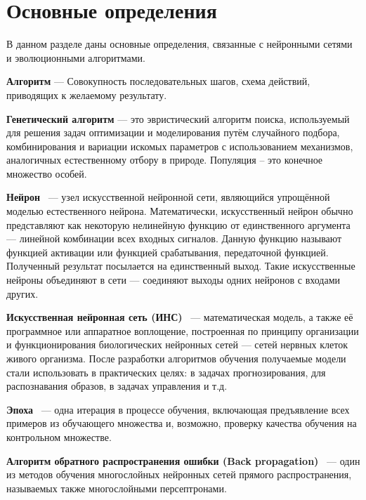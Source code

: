 \section{Основные определения}
\indent \indent В данном разделе даны основные определения, связанные с нейронными сетями и эволюционными алгоритмами.

 \textbf{Алгоритм} — Совокупность последовательных шагов, схема действий, приводящих к желаемому результату. 

 \textbf{Генетический алгоритм} — это эвристический алгоритм поиска, используемый для решения задач оптимизации и моделирования путём случайного подбора, комбинирования и вариации искомых параметров с использованием механизмов, аналогичных естественному отбору в природе.
Популяция – это конечное множество особей.

 \textbf{Нейрон} ~--- узел искусственной нейронной сети, являющийся упрощённой моделью естественного нейрона. Математически, искусственный нейрон обычно представляют как некоторую нелинейную функцию от единственного аргумента — линейной комбинации всех входных сигналов. Данную функцию называют функцией активации или функцией срабатывания, передаточной функцией. Полученный результат посылается на единственный выход. Такие искусственные нейроны объединяют в сети — соединяют выходы одних нейронов с входами других. 

 \textbf{Искусственная нейронная сеть (ИНС)}  ~--- математическая модель, а также её программное или аппаратное воплощение, построенная по принципу организации и функционирования биологических нейронных сетей — сетей нервных клеток живого организма. После разработки алгоритмов обучения получаемые модели стали использовать в практических целях: в задачах прогнозирования, для распознавания образов, в задачах управления и т.д. 

 \textbf{Эпоха} ~--- одна итерация в процессе обучения, включающая предъявление всех примеров из обучающего множества и, возможно, проверку качества обучения на контрольном множестве. 

 \textbf{Алгоритм обратного распространения ошибки (Back propagation)} ~--- один из методов обучения многослойных нейронных сетей прямого распространения, называемых также многослойными персептронами.